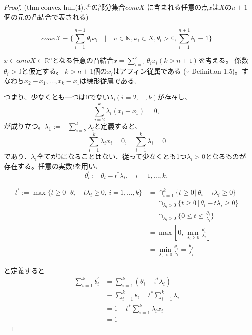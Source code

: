 \documentclass[12pt]{jsarticle}
\begin{document}
\begin{proof}
(thm convex hull(4)$\mathbb{R}^n$の部分集合$conv X$ に含まれる任意の点$x$は$X$の$n+1$個の元の凸結合で表される)

\[
conv X = {\{ \sum \limits_{i=1}^{n+1} \theta_i x_i \quad |\quad n \in \mathbb{N}, x_i \in X, \theta_i > 0, \sum
\limits_{i=1}^{n+1} \theta_i = 1} \}
\]

$x \in conv X \subset \mathbb{R}^n$となる任意の凸結合$x =  \sum \limits_{i=1}^{k} \theta_i x_i (k > n+1)$を考える。
係数$\theta_i > 0$と仮定する。
$k > n+1$個の$x_i$はアフィン従属である
($\because$ Definition 1.5)。すなわち$x_2 - x_1, \dots, x_k - x_1$は線形従属である。

つまり、少なくとも一つは0でない$\lambda_i (i  = 2, \dots, k)$が存在し、
\[
\sum \limits_{i=2}^{k} \lambda_i (x_i - x_1)= 0,
\]
が成り立つ。$\lambda_1 := - \sum \limits_{i=2}^{k} \lambda_i $と定義すると、
\[
\sum \limits_{i=1}^{k} \lambda_i x_i = 0,  \quad  \sum \limits_{i=1}^{k} \lambda_i  = 0
\]
であり、$\lambda_i$全てが$0$になることはない、従って少なくとも1つ$\lambda_i > 0$となるものが存在する。任意の実数$t$を用い、
\[
\theta_i^{\prime} := \theta_i - t^* \lambda_i, \quad i = 1,\dots, k,
\]

\begin{align*}
t^* := \max \{t  \ge 0 \, | \, \theta_i - t \lambda_i \ge 0, \, i = 1,\dots, k\} &= \cap_{i=1}^{k} \{t  \ge 0 \, | \, \theta_i - t \lambda_i \ge 0\}\\
                                                                                                                  &= \cap_{\lambda_i > 0} \{t  \ge 0 \, | \, \theta_i - t \lambda_i \ge 0\}\\
                                                                                                                  &= \cap_{\lambda_i > 0} \{0 \le t \le {\frac{\theta_i}{\lambda_i}}\}\\
                                                                                                                  &= \max [0, \min_{\lambda_i > 0}{\frac{\theta_i}{\lambda_i}}] \\
                                                                                                                  &= \min_{\lambda_i > 0}{\frac{\theta_i}{\lambda_i}}  = \frac{\theta_j}{\lambda_j}
\end{align*}

と定義すると
\begin{align*}
 \sum \limits_{i=1}^{k} \theta_i^{\prime} &=  \sum \limits_{i=1}^{k} (\theta_i - t^*\lambda_i)\\
                                                                          &= \sum \limits_{i=1}^{k} \theta_i - t^* \sum \limits_{i=1}^{k} \lambda_i \\
                                                                          &= 1 - t^* \sum \limits_{i=1}^{k} \lambda_i x_i  \\
                                                                          &= 1
\end{align*}


\end{proof}
\end{document}
